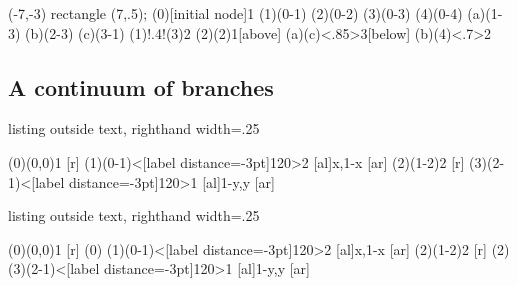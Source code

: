 \begin{tcblisting}{}
\begin{istgame}[scale=1]
\useasboundingbox (-7,-3) rectangle (7,.5);
\xtdistance{10mm}{40mm}
\istroot(0)[initial node]{1}  \istb  \istb  \istb  \istb \endist
\xtdistance{10mm}{10mm}
\istroot(1)(0-1)     \istb  \istb  \istb  \endist
\istroot(2)(0-2)  \istb  \istb  \istb  \endist
\xtdistance{10mm}{20mm}
\istroot(3)(0-3)  \istb  \istb  \endist
\istroot(4)(0-4)  \istb  \istb  \endist
\xtdistance{10mm}{7mm}
\istroot(a)(1-3)  \istb  \istb  \istb  \endist
\istroot(b)(2-3)  \istb  \istb  \endist
\istroot(c)(3-1)  \istb  \istb  \istb  \endist
\xtCInfosetO[fill=red!20](1)!.4!(3){2} 
\xtInfosetO(2)(2){1}[above]
(a)(c)<.85>{3}[below]
\setxtinfosetlayer %
\xtCInfosetO[fill=blue!20](b)(4)<.7>{2}
\end{istgame}
\end{tcblisting}


\subsection{A continuum of branches}

\begin{tcblisting}{listing outside text, righthand width=.25\linewidth}
\begin{istgame}[font=\scriptsize]
\cntmdistance*{8mm}{16mm}
\istrootcntm(0)(0,0){1}  [r]  \endist
\istroot(1)(0-1)<[label distance=-3pt]120>{2}
  [al]{x,1-x}    [ar] \endist
\cntmpreset %
\istrootcntm(2)(1-2){2}  [r]  \istbm  \endist
\istroot(3)(2-1)<[label distance=-3pt]120>{1}
  [al]{1-y,y}  [ar] \endist
\end{istgame}
\end{tcblisting}


\begin{tcblisting}{listing outside text, righthand width=.25\linewidth}
\begin{istgame}[font=\scriptsize]
\cntmdistance*{8mm}{16mm}
\istrootcntmA(0)(0,0){1} [r]  \endist
\cntmAInfoset(0)
\istroot(1)(0-1)<[label distance=-3pt]120>{2}
  [al]{x,1-x}    [ar]  \endist
\istrootcntmA(2)(1-2){2} [r]  \endist
\cntmAInfosetO[fill=blue!20](2)
\istroot(3)(2-1)<[label distance=-3pt]120>{1}
  [al]{1-y,y}  [ar]  \endist
\end{istgame}
\end{tcblisting}


